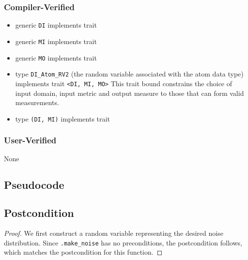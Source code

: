 \documentclass{article}
\begin{document}
\subsubsection*{Compiler-Verified}
\begin{itemize}
    \item generic \texttt{DI} implements trait 
    \item generic \texttt{MI} implements trait 
    \item generic \texttt{MO} implements trait 
    \item type \texttt{DI\_Atom\_RV2} (the random variable associated with the atom data type) implements trait \texttt{<DI, MI, MO>}
        This trait bound constrains the choice of input domain, input metric and output measure to those that can form valid measurements.
    \item type \texttt{(DI, MI)} implements trait 
\end{itemize}

\subsubsection*{User-Verified}
None

\subsection*{Pseudocode}


\subsection*{Postcondition}
\begin{theorem}
\end{theorem}

\begin{proof}
    We first construct a random variable  representing the desired noise distribution.
    Since \texttt{.make\_noise} has no preconditions,
    the postcondition follows, which matches the postcondition for this function.
\end{proof}
\end{document}
